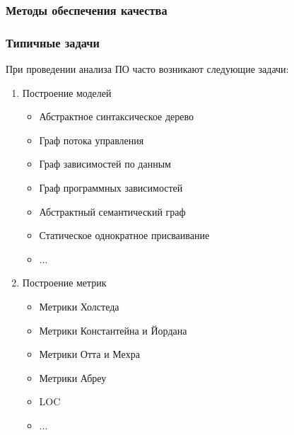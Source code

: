 \documentclass{beamer}
\begin{document}
\begin{frame}
\frametitle{Методы обеспечения качества}


\end{frame}

\begin{frame}
\frametitle{Типичные задачи}

При проведении анализа ПО часто возникают следующие задачи:

\begin{enumerate}
    \item Построение моделей
    \begin{itemize}
        \item Абстрактное синтаксическое дерево
        \item Граф потока управления
        \item Граф зависимостей по данным
        \item Граф программных зависимостей
        \item Абстрактный семантический граф
        \item Статическое однократное присваивание
        \item ...
    \end{itemize}

    \item Построение метрик
    \begin{itemize}
        \item Метрики Холстеда
        \item Метрики Константейна и Йордана
        \item Метрики Отта и Мехра
        \item Метрики Абреу
        \item LOC
        \item ...
    \end{itemize}
\end{enumerate}

\end{frame}
\end{document}

